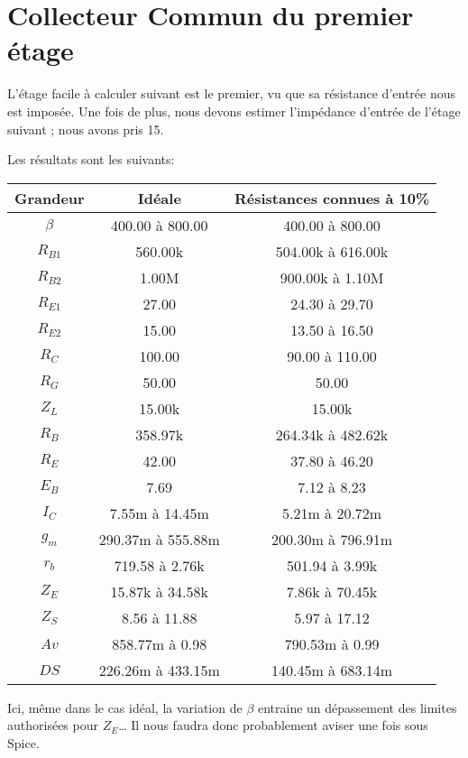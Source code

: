   \section{Collecteur Commun du premier étage}
   L’étage facile à calculer suivant est le premier, vu que sa résistance d’entrée
   nous est imposée.
   Une fois de plus, nous devons estimer l’impédance d’entrée de l’étage suivant ; 
   nous avons pris 15\kilo\ohm.

   Les résultats sont les suivants:

   \begin{tabular}{|c|c|c|}
    \hline
 Grandeur  &       Idéale    &  Résistances connues à 10\% \\\hline
 $\beta$   & 400.00 à 800.00 & 400.00 à 800.00 \\\hline
 $R_{B1}$  &     560.00k      &504.00k à 616.00k\\\hline
 $R_{B2}$  &      1.00M       & 900.00k à 1.10M \\\hline
 $R_{E1}$  &      27.00       &  24.30 à 29.70  \\\hline
 $R_{E2}$  &      15.00       &  13.50 à 16.50  \\\hline
 $R_C$     &      100.00      & 90.00 à 110.00  \\\hline
 $R_G$     &      50.00       &      50.00       \\\hline
 $Z_L$     &      15.00k      &      15.00k      \\\hline
 $R_B$     &     358.97k      &264.34k à 482.62k\\\hline
 $R_E$     &      42.00       &  37.80 à 46.20  \\\hline
 $E_B$     &       7.69       &   7.12 à 8.23   \\\hline
 $I_C$     & 7.55m à 14.45m  & 5.21m à 20.72m  \\\hline
 $g_m$     &290.37m à 555.88m&200.30m à 796.91m\\\hline
 $r_b$     & 719.58 à 2.76k  & 501.94 à 3.99k  \\\hline
 $Z_E$     & 15.87k à 34.58k & 7.86k à 70.45k  \\\hline
 $Z_S$     &  8.56 à 11.88   &  5.97 à 17.12   \\\hline
 $Av$      & 858.77m à 0.98  & 790.53m à 0.99  \\\hline
 $DS$      &226.26m à 433.15m&140.45m à 683.14m\\\hline
\end{tabular}

    Ici, même dans le cas idéal, la variation de $\beta$ entraine un dépassement des
    limites authorisées pour $Z_E$… Il nous faudra donc probablement aviser une fois 
    sous Spice.


